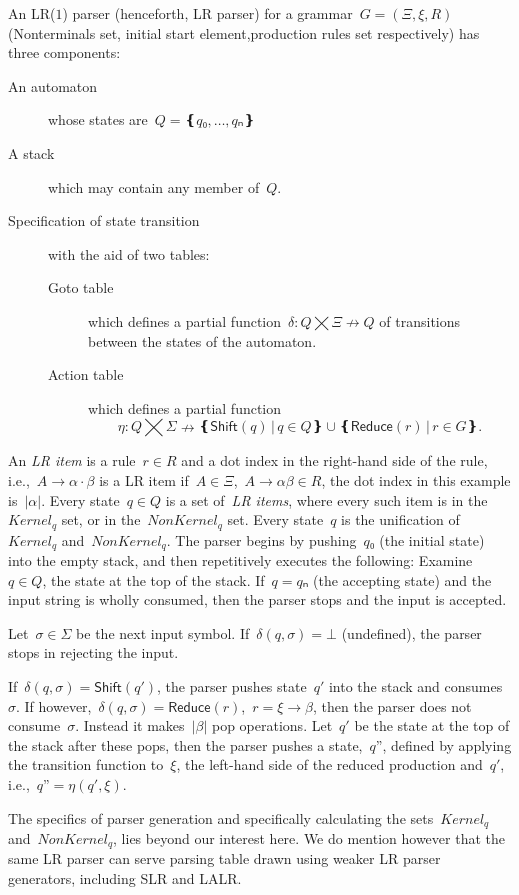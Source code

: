 An LR($1$) parser (henceforth, LR parser) for a grammar~$G=(Ξ,ξ,R)$ (Nonterminals set, initial start element,production rules set respectively)
  has three components:
\begin{description}
  \item[An automaton] whose states are~$Q=❴q₀,…,qₙ❵$
  \item[A stack] which may contain any member of~$Q$.
  \item[Specification of state transition] with the aid of two tables:
  \begin{description}
    \item[Goto table] which defines a partial function~$δ:Q⨉Ξ↛Q$ of transitions
    between the states of the automaton.
    \item[Action table] which
    defines a partial function\[η:Q⨉Σ↛ ❴ \textsf{Shift}(q) \,|\, q∈Q❵ ∪ ❴\textsf{Reduce}(r) \,| \, r∈G❵.\]
  \end{description}
\end{description}
An \emph{LR item} is a rule~$r∈R$ and a dot index in the right-hand side of the rule,
  i.e.,~$A→α·β$ is a LR item if~$A∈Ξ$,~$A→αβ∈R$,
  the dot index in this example is~$|α|$.
Every state~$q∈Q$ is a set of~\emph{LR items},
  where every such item is in the~$Kernel_{q}$ set,
  or in the~$NonKernel_{q}$ set.
Every state~$q$ is the unification of~$Kernel_{q}$ and~$NonKernel_{q}$.
The parser begins by pushing~$q₀$ (the initial state) into the empty stack,
and then repetitively executes the following:
Examine~$q∈Q$, the state at the top of the stack.
If~$q=qₙ$ (the accepting state) and the input string is wholly consumed, then the parser stops and the input is accepted.

Let~$σ∈Σ$ be the next input symbol.
If~$δ(q,σ)=⊥$ (undefined), the parser stops in rejecting the input.

If~$δ(q,σ) = \textsf{Shift}(q')$, the parser pushes state~$q'$
into the stack and consumes~$σ$.
If however,~$δ(q,σ) = \textsf{Reduce}(r)$,~$r=ξ→β$,
then the parser does not consume~$σ$.
Instead it makes~$|β|$ pop operations.
Let~$q'$ be the state at the top of the stack after these pops, then
the parser pushes a state,~$q”$,
defined by applying the transition function to~$ξ$, the left-hand side of the reduced production and~$q'$,
i.e.,~$q”=η(q',ξ)$.

The specifics of parser generation and specifically
  calculating the sets~$Kernel_{q}$ and~$NonKernel_{q}$, lies beyond our interest here.
We do mention however that the same LR parser can serve parsing table drawn using weaker LR parser generators,
including SLR and LALR\@.

